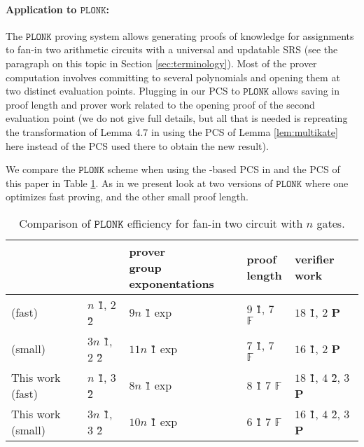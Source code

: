 \documentclass[11pt]{article} %
\newcommand{\F}{\ensuremath{\mathbb F}\xspace}
\newcommand{\plonk}{\ensuremath{\mathtt{PLONK}}\xspace}
\begin{document}
\paragraph{Application to \plonk:}


The \plonk proving system \cite{plonk}  allows generating proofs of knowledge for assignments
to fan-in two arithmetic circuits with a universal and updatable SRS (see the paragraph on this topic in Section \ref{sec:terminology}). Most of the prover computation involves committing to several polynomials and opening them at two distinct evaluation points. Plugging in our PCS to \plonk allows saving in proof length and prover work related to the opening proof of the second evaluation point (we do not give full details, but all that is needed is repreating the transformation of Lemma 4.7 in \cite{plonk} using the PCS of Lemma \ref{lem:multikate} here instead of the PCS used there to obtain the new result).

We compare the \plonk scheme when using the  \cite{kate}-based PCS in \cite{gwc} and the PCS of this paper in Table \ref{table:plonk}. As in \cite{plonk} we present look at two versions of \plonk where one optimizes fast proving, and the other small proof length.

\begin{table}[!htbp]
	\caption{Comparison of \plonk efficiency for fan-in two circuit with $n$  gates.}
	\centering
\begin{adjustbox}{width=1\textwidth}
	\begin{tabular}{l|l|l|l|l}
	 & \thead{SRS size} & \thead{prover \\ group exponentations} & \thead{proof\\ length} & verifier work \\ \hline
		\cite{plonk} (fast) &  $n$ \G1, $2$ \G2  & $9n$ \G1 exp   & $9$ \G1, $7$ \F  &   $18$ \G1, $2$ \textbf{P} \\ \hline
		\cite{plonk} (small) &  $3n$ \G1, $2$ \G2  & $11n$ \G1 exp   & $7$ \G1, $7$ \F  &   $16$ \G1, $2$ \textbf{P} \\ \hline
		This work (fast)    &$n$ \G1, $3$ \G2 &  $8n$ \G1 exp    & $8$ \G1 $7$ \F &   $18$ \G1, $4$ \G2, $3$ \textbf{P} \\ \hline
		This work (small)    &$3n$ \G1, $3$ \G2 &  $10n$ \G1 exp    & $6$ \G1 $7$ \F &   $16$ \G1, $4$ \G2, $3$ \textbf{P} \\ \hline

		\end{tabular}
\end{adjustbox}
\label{table:plonk}
\end{table} 
\end{document}
